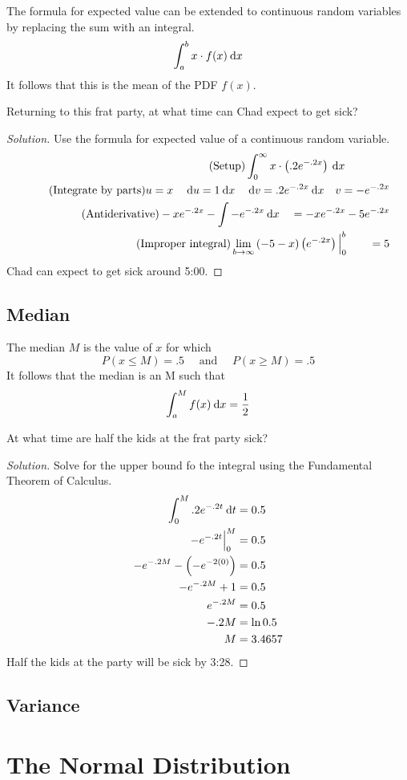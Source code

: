 \documentclass[11pt,leqno,letterpaper]{article}
\begin{document}
The formula for expected value can be extended to continuous
random variables by replacing the sum with an integral.
\[
\int_a^b x\cdot f(x)\:\mathrm{d}x
\]
It follows that this is the mean of the PDF $f(x)$.
\begin{mdframed}
\begin{problem}
Returning to this frat party,
at what time can Chad expect to get sick?
\begin{proof}[Solution]
Use the formula for expected value of a continuous random variable.
\begin{align*}
\tag{Setup}
\int_0^\infty x\cdot \left(.2e^{-.2x}\right)\:\mathrm{d}x \qquad \qquad \\
\tag{Integrate by parts}
u=x \quad \:\mathrm{d}u = 1\:\mathrm{d}x \quad \:\mathrm{d}v = .2e^{-.2x}\:\mathrm{d}x \quad v = -e^{-.2x} \\
\tag{Antiderivative}
-xe^{-.2x} - \int -e^{-.2x}\:\mathrm{d}x \quad = -xe^{-.2x} -5e^{-.2x} \\
\tag{Improper integral}
\lim_{b\to \infty}\left(-5-x\right)\left(e^{-.2x}\right)\Big|_0^b
\qquad = 5
\end{align*}
Chad can expect to get sick around 5:00\AM{}.
\end{proof}
\end{problem}
\end{mdframed}
\subsection{Median}
The median $M$ is the value of $x$ for which
\[
P(x\leq M) = .5 \quad \text{ and } \quad P(x\geq M) = .5
\]
It follows that the median is an M such that
\[
\int_a^M f(x) \:\mathrm{d}x = \frac{1}{2}
\]
\begin{mdframed}
\begin{problem}
At what time are half the kids at the frat party sick?
\begin{proof}[Solution]
Solve for the upper bound fo the integral using
the Fundamental Theorem of Calculus.
\begin{align*}
\int_0^M .2e^{-.2t}\:\mathrm{d}t &= 0.5 \\
-e^{-.2t}\Big|_0^M &= 0.5 \\
-e^{-.2M}-\left(-e^{-2(0)}\right) &= 0.5 \\
-e^{-.2M} +1 &= 0.5 \\
e^{-.2M} &= 0.5 \\
-.2M &= \ln 0.5 \\
M &= 3.4657
\end{align*}
Half the kids at the party will be sick by 3:28\AM{}.
\end{proof}
\end{problem}
\end{mdframed}
\subsection{Variance}


\section{The Normal Distribution}
\end{document}
